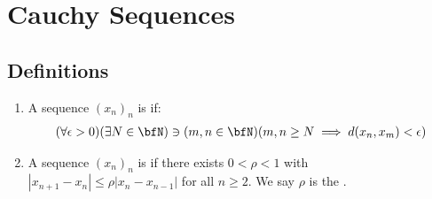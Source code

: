 \chapter*{Cauchy Sequences}

\section*{Definitions}
    \begin{enumerate}[label = (\arabic*)]
        \item A sequence $(x_n)_n$ is  if:
            \begin{equation*}
            \begin{split}
                (\forall \epsilon > 0)(\exists N \in \bfN) \ni (m,n \in \bfN)(m,n \geq N \implies d(x_n,x_m) < \epsilon)
            \end{split}
            \end{equation*}

        \item A sequence $(x_n)_n$ is  if there exists $0 < \rho < 1$ with $|x_{n+1} - x_n| \leq \rho |x_{n} - x_{n-1}|$ for all $n\geq 2$. We say $\rho$ is the .
    \end{enumerate}

